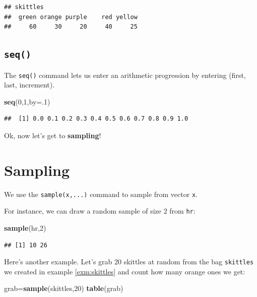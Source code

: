 \documentclass[
]{book}
\newenvironment{Shaded}{\begin{snugshade}}{\end{snugshade}}
\newcommand{\AttributeTok}[1]{\textcolor[rgb]{0.13,0.29,0.53}{#1}}
\newcommand{\DecValTok}[1]{\textcolor[rgb]{0.00,0.00,0.81}{#1}}
\newcommand{\FunctionTok}[1]{\textcolor[rgb]{0.13,0.29,0.53}{\textbf{#1}}}
\newcommand{\NormalTok}[1]{#1}
\newcommand{\OtherTok}[1]{\textcolor[rgb]{0.56,0.35,0.01}{#1}}
\theoremstyle{definition}
\theoremstyle{definition}
\theoremstyle{definition}
\theoremstyle{definition}
\theoremstyle{remark}
\begin{document}
\begin{verbatim}
## skittles
##  green orange purple    red yellow 
##     60     30     20     40     25
\end{verbatim}

\subsection*{\texorpdfstring{\texttt{seq()}}{seq()}}\label{seq}

The \texttt{seq()} command lets us enter an arithmetic progression by entering (first, last, increment).

\begin{Shaded}
\begin{Highlighting}[]
\FunctionTok{seq}\NormalTok{(}\DecValTok{0}\NormalTok{,}\DecValTok{1}\NormalTok{,}\AttributeTok{by=}\NormalTok{.}\DecValTok{1}\NormalTok{)}
\end{Highlighting}
\end{Shaded}

\begin{verbatim}
##  [1] 0.0 0.1 0.2 0.3 0.4 0.5 0.6 0.7 0.8 0.9 1.0
\end{verbatim}

Ok, now let's get to \textbf{sampling}!

\section{Sampling}\label{sampling-in-R}

We use the \texttt{sample(x,...)} command to sample from vector \texttt{x}.

For instance, we can draw a random sample of size 2 from \texttt{hr}:

\begin{Shaded}
\begin{Highlighting}[]
\FunctionTok{sample}\NormalTok{(hr,}\DecValTok{2}\NormalTok{)}
\end{Highlighting}
\end{Shaded}

\begin{verbatim}
## [1] 10 26
\end{verbatim}

Here's another example. Let's grab 20 skittles at random from the bag \texttt{skittles} we created in example \ref{exm:skittles} and count how many orange ones we get:

\begin{Shaded}
\begin{Highlighting}[]
\NormalTok{grab}\OtherTok{=}\FunctionTok{sample}\NormalTok{(skittles,}\DecValTok{20}\NormalTok{)}
\FunctionTok{table}\NormalTok{(grab)}
\end{Highlighting}
\end{Shaded}
\end{document}
